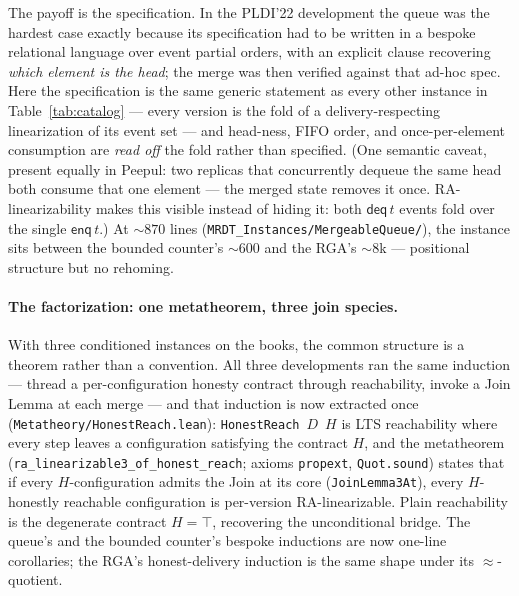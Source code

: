 \documentclass[11pt]{article}
\newcommand{\lean}[1]{\texttt{#1}}
\newcommand{\eqobs}{\approx}
\begin{document}
The payoff is the specification. In the PLDI'22 development the queue was
the hardest case exactly because its specification had to be written in a
bespoke relational language over event partial orders, with an explicit
clause recovering \emph{which element is the head}; the merge was then
verified against that ad-hoc spec. Here the specification is the same
generic statement as every other instance in
Table~\ref{tab:catalog} --- every version is the fold of a
delivery-respecting linearization of its event set --- and head-ness,
FIFO order, and once-per-element consumption are \emph{read off} the fold
rather than specified. (One semantic caveat, present equally in Peepul:
two replicas that concurrently dequeue the same head both consume that one
element --- the merged state removes it once. RA-linearizability makes this
visible instead of hiding it: both $\mathsf{deq}\,t$ events fold over the
single $\mathsf{enq}\,t$.) At ${\sim}870$ lines
(\lean{MRDT\_Instances/MergeableQueue/}), the instance sits between the
bounded counter's ${\sim}600$ and the RGA's ${\sim}8$k --- positional
structure but no rehoming.

\paragraph{The factorization: one metatheorem, three join species.} With
three conditioned instances on the books, the common structure is a
theorem rather than a convention. All three developments ran the same
induction --- thread a per-configuration honesty contract through
reachability, invoke a Join Lemma at each merge --- and that induction is
now extracted once (\lean{Metatheory/HonestReach.lean}):
\lean{HonestReach}~$D$~$H$ is LTS reachability where every step leaves a
configuration satisfying the contract $H$, and the metatheorem
(\lean{ra\_linearizable3\_of\_honest\_reach}; axioms \lean{propext},
\lean{Quot.sound}) states that if every $H$-configuration admits the Join
at its core (\lean{JoinLemma3At}), every $H$-honestly reachable
configuration is per-version RA-linearizable. Plain reachability is the
degenerate contract $H = \top$, recovering the unconditional bridge. The
queue's and the bounded counter's bespoke inductions are now one-line
corollaries; the RGA's honest-delivery induction is the same shape under
its $\eqobs$-quotient.
\end{document}
